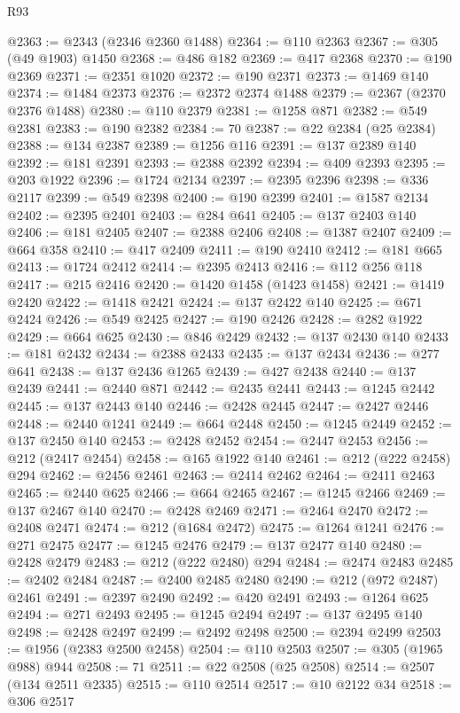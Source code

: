 \begin{lexlean}{R93}
\begin{coremodule}
@2363 := @2343 (@2346 @2360 @1488)
@2364 := @110 @2363
@2367 := @305 (@49 @1903) @1450
@2368 := @486 @182
@2369 := @417 @2368
@2370 := @190 @2369
@2371 := @2351 @1020
@2372 := @190 @2371
@2373 := @1469 @140
@2374 := @1484 @2373
@2376 := @2372 @2374 @1488
@2379 := @2367 (@2370 @2376 @1488)
@2380 := @110 @2379
@2381 := @1258 @871
@2382 := @549 @2381
@2383 := @190 @2382
@2384 := 70
@2387 := @22 @2384 (@25 @2384)
@2388 := @134 @2387
@2389 := @1256 @116
@2391 := @137 @2389 @140
@2392 := @181 @2391
@2393 := @2388 @2392
@2394 := @409 @2393
@2395 := @203 @1922
@2396 := @1724 @2134
@2397 := @2395 @2396
@2398 := @336 @2117
@2399 := @549 @2398
@2400 := @190 @2399
@2401 := @1587 @2134
@2402 := @2395 @2401
@2403 := @284 @641
@2405 := @137 @2403 @140
@2406 := @181 @2405
@2407 := @2388 @2406
@2408 := @1387 @2407
@2409 := @664 @358
@2410 := @417 @2409
@2411 := @190 @2410
@2412 := @181 @665
@2413 := @1724 @2412
@2414 := @2395 @2413
@2416 := @112 @256 @118
@2417 := @215 @2416
@2420 := @1420 @1458 (@1423 @1458)
@2421 := @1419 @2420
@2422 := @1418 @2421
@2424 := @137 @2422 @140
@2425 := @671 @2424
@2426 := @549 @2425
@2427 := @190 @2426
@2428 := @282 @1922
@2429 := @664 @625
@2430 := @846 @2429
@2432 := @137 @2430 @140
@2433 := @181 @2432
@2434 := @2388 @2433
@2435 := @137 @2434
@2436 := @277 @641
@2438 := @137 @2436 @1265
@2439 := @427 @2438
@2440 := @137 @2439
@2441 := @2440 @871
@2442 := @2435 @2441
@2443 := @1245 @2442
@2445 := @137 @2443 @140
@2446 := @2428 @2445
@2447 := @2427 @2446
@2448 := @2440 @1241
@2449 := @664 @2448
@2450 := @1245 @2449
@2452 := @137 @2450 @140
@2453 := @2428 @2452
@2454 := @2447 @2453
@2456 := @212 (@2417 @2454)
@2458 := @165 @1922 @140
@2461 := @212 (@222 @2458) @294
@2462 := @2456 @2461
@2463 := @2414 @2462
@2464 := @2411 @2463
@2465 := @2440 @625
@2466 := @664 @2465
@2467 := @1245 @2466
@2469 := @137 @2467 @140
@2470 := @2428 @2469
@2471 := @2464 @2470
@2472 := @2408 @2471
@2474 := @212 (@1684 @2472)
@2475 := @1264 @1241
@2476 := @271 @2475
@2477 := @1245 @2476
@2479 := @137 @2477 @140
@2480 := @2428 @2479
@2483 := @212 (@222 @2480) @294
@2484 := @2474 @2483
@2485 := @2402 @2484
@2487 := @2400 @2485 @2480
@2490 := @212 (@972 @2487) @2461
@2491 := @2397 @2490
@2492 := @420 @2491
@2493 := @1264 @625
@2494 := @271 @2493
@2495 := @1245 @2494
@2497 := @137 @2495 @140
@2498 := @2428 @2497
@2499 := @2492 @2498
@2500 := @2394 @2499
@2503 := @1956 (@2383 @2500 @2458)
@2504 := @110 @2503
@2507 := @305 (@1965 @988) @944
@2508 := 71
@2511 := @22 @2508 (@25 @2508)
@2514 := @2507 (@134 @2511 @2335)
@2515 := @110 @2514
@2517 := @10 @2122 @34
@2518 := @306 @2517

\end{coremodule}
\end{lexlean}
